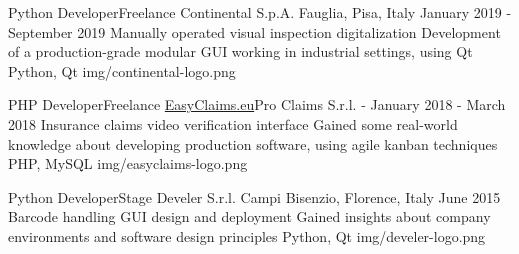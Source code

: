 \begin{cventries}
  \logocventry
    {Python Developer{\enskip\cdotp\enskip}Freelance}
    {Continental S.p.A.}
    {Fauglia, Pisa, Italy}
    {January 2019 - September 2019}
    {
      \cvexp
        {Manually operated visual inspection digitalization}
        {Development of a production-grade modular GUI working in industrial settings, using Qt}
        {Python, Qt}
    }
    {img/continental-logo.png}

  \logocventry
    {PHP Developer{\enskip\cdotp\enskip}Freelance}
    {\href{https://www.easyclaims.eu}{EasyClaims.eu}{\enskip\cdotp\enskip}Pro Claims S.r.l.}
    {-}
    {January 2018 - March 2018}
    {
      \cvexp
        {Insurance claims video verification interface}
        {Gained some real-world knowledge about developing production software, using agile kanban techniques}
        {PHP, MySQL}
    }
    {img/easyclaims-logo.png}

  \logocventry
    {Python Developer{\enskip\cdotp\enskip}Stage}
    {Develer S.r.l.}
    {Campi Bisenzio, Florence, Italy}
    {June 2015}
    {
      \cvexp
        {Barcode handling GUI design and deployment}
        {Gained insights about company environments and software design principles}
        {Python, Qt}
    }
    {img/develer-logo.png}

\end{cventries}
